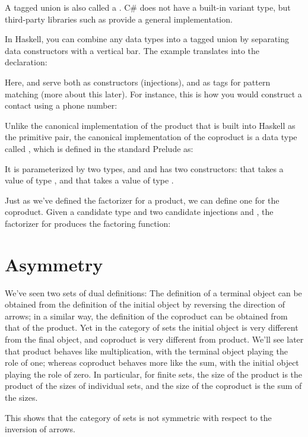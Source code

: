 A tagged union is also called a . C\# does not have a
built-in variant type, but third-party libraries such as 
provide a general implementation.

In Haskell, you can combine any data types into a tagged union by
separating data constructors with a vertical bar. The 
example translates into the declaration:

Here,  and  serve both as
constructors (injections), and as tags for pattern matching (more about
this later). For instance, this is how you would construct a contact
using a phone number:

Unlike the canonical implementation of the product that is built into
Haskell as the primitive pair, the canonical implementation of the
coproduct is a data type called , which is defined in the
standard Prelude as:

It is parameterized by two types,  and  and has two
constructors:  that takes a value of type , and
 that takes a value of type .

Just as we've defined the factorizer for a product, we can define one
for the coproduct. Given a candidate type  and two candidate
injections  and , the factorizer for 
produces the factoring function:


\section{Asymmetry}

We've seen two sets of dual definitions: The definition of a terminal
object can be obtained from the definition of the initial object by
reversing the direction of arrows; in a similar way, the definition of
the coproduct can be obtained from that of the product. Yet in the
category of sets the initial object is very different from the final
object, and coproduct is very different from product. We'll see later
that product behaves like multiplication, with the terminal object
playing the role of one; whereas coproduct behaves more like the sum,
with the initial object playing the role of zero. In particular, for
finite sets, the size of the product is the product of the sizes of
individual sets, and the size of the coproduct is the sum of the sizes.

This shows that the category of sets is not symmetric with respect to
the inversion of arrows.

